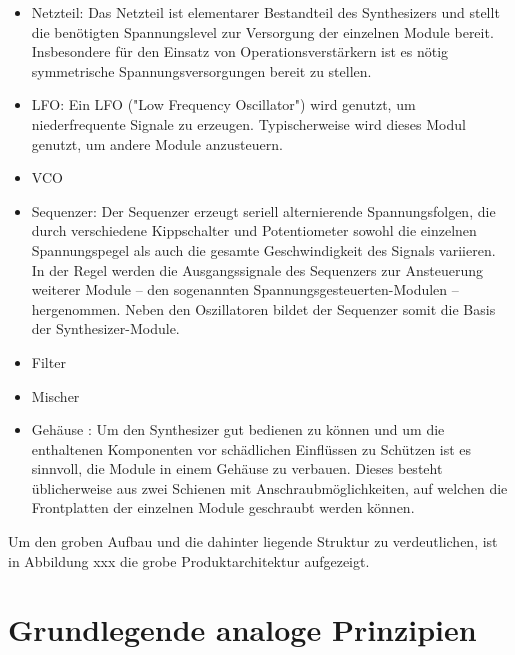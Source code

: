 \begin{itemize}
	\item Netzteil:\newline
	Das Netzteil ist elementarer Bestandteil des Synthesizers und stellt die benötigten Spannungslevel zur Versorgung der einzelnen Module bereit.
	Insbesondere für den Einsatz von Operationsverstärkern ist es nötig symmetrische Spannungsversorgungen bereit zu stellen.
	
	\item LFO: \newline
	Ein LFO ("Low Frequency Oscillator") wird genutzt, um niederfrequente Signale zu erzeugen.
	Typischerweise wird dieses Modul genutzt, um andere Module anzusteuern.
	
	\item VCO
	\item Sequenzer: \newline
	Der Sequenzer erzeugt seriell alternierende Spannungsfolgen, die durch verschiedene Kippschalter und Potentiometer sowohl die einzelnen Spannungspegel als auch die gesamte Geschwindigkeit des Signals variieren. In der Regel werden die Ausgangssignale des Sequenzers zur Ansteuerung weiterer Module – den sogenannten Spannungsgesteuerten-Modulen – hergenommen. Neben den Oszillatoren bildet der Sequenzer somit die Basis der Synthesizer-Module.
	\item Filter
	\item Mischer
	\item Gehäuse : \newline
	Um den Synthesizer gut bedienen zu können und um die enthaltenen Komponenten vor schädlichen Einflüssen zu Schützen ist es sinnvoll, 
	die Module in einem Gehäuse zu verbauen. Dieses besteht üblicherweise aus zwei Schienen mit Anschraubmöglichkeiten, 
	auf welchen die Frontplatten der einzelnen Module geschraubt werden können.  
\end{itemize}

Um den groben Aufbau und die dahinter liegende Struktur zu verdeutlichen, ist in Abbildung xxx die grobe Produktarchitektur aufgezeigt.


\section{Grundlegende analoge Prinzipien}
\label{sec:AnalogePrinzipien}



